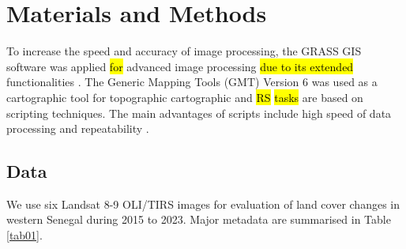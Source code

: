 \documentclass[earth,article,submit,pdftex,moreauthors]{Definitions/mdpi}
\begin{document}
\section{Materials and Methods}

To increase the speed and accuracy of image processing, the\hl{ }GRASS GIS software was applied \hl{for} advanced image processing \hl{due to its extended} functionalities \cite{Neteleretal2008}. The Generic Mapping Tools (GMT) Version 6 \cite{Wessel} {was} used as a cartographic tool for topographic { }cartographic and \hl{RS} \hl{tasks }are based on\hl{ }scripting techniques{. The }main advantages {of scripts}\hl{ }include{ }high speed of data processing and repeatability\hl{ }\cite{min13050604,Lemenkova202213,Lemenkova202206}.

\subsection{Data}

We use six Landsat 8-9 OLI/TIRS images for evaluation of land cover changes in western Senegal during 2015 to 2023{. Major metadata are }summarised in Table \ref{tab01}{.} 
\end{document}
